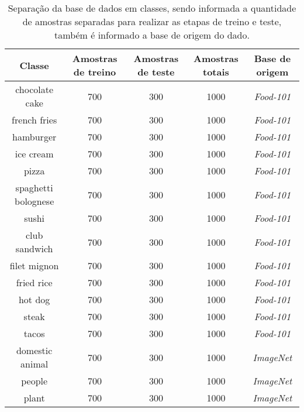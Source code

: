\begin{table}[H]
    \centering
    \caption[Disposição da base de dados]{Separação da base de dados em classes, sendo informada a quantidade de amostras separadas para realizar as etapas de treino e teste, também é informado a base de origem do dado.
    \label{tab:base_images}}
    \begin{tabular}{ccccc}
        \toprule
             Classe & Amostras de treino & Amostras de teste & Amostras totais & Base de origem \\
        \midrule
            chocolate cake & 700 & 300 & 1000 & \textit{Food-101}\\
            french fries & 700 & 300 & 1000 & \textit{Food-101}\\
            hamburger & 700 & 300 & 1000 & \textit{Food-101}\\
            ice cream & 700 & 300 & 1000 & \textit{Food-101}\\
            pizza & 700 & 300 & 1000 & \textit{Food-101}\\
            spaghetti bolognese & 700 & 300 & 1000 & \textit{Food-101}\\
            sushi & 700 & 300 & 1000 & \textit{Food-101}\\
            club sandwich & 700 & 300 & 1000 & \textit{Food-101}\\
            filet mignon & 700 & 300 & 1000 & \textit{Food-101}\\
            fried rice & 700 & 300 & 1000 & \textit{Food-101}\\
            hot dog & 700 & 300 & 1000 & \textit{Food-101}\\
            steak & 700 & 300 & 1000 & \textit{Food-101}\\
            tacos & 700 & 300 & 1000 & \textit{Food-101}\\
            domestic animal & 700 & 300 & 1000 & \textit{ImageNet}\\
            people & 700 & 300 & 1000 & \textit{ImageNet}\\
            plant & 700 & 300 & 1000 & \textit{ImageNet}\\
        \bottomrule
    \end{tabular}
\end{table}
